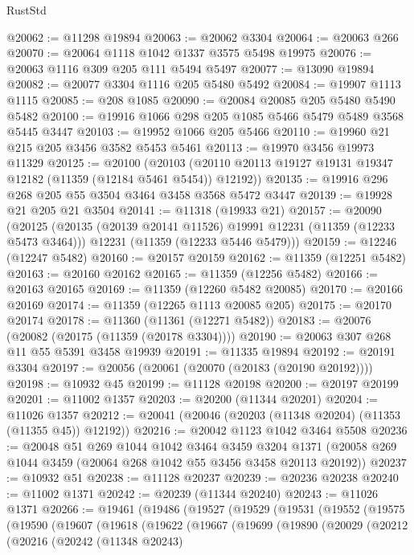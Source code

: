 \begin{lexlean}{RustStd}
\begin{coremodule}
{{{{{{{{{{{{{{{{{{{@20062 := @11298 @19894
@20063 := @20062 @3304
@20064 := @20063 @266
@20070 := @20064 @1118 @1042 @1337 @3575 @5498 @19975
@20076 := @20063 @1116 @309 @205 @111 @5494 @5497
@20077 := @13090 @19894
@20082 := @20077 @3304 @1116 @205 @5480 @5492
@20084 := @19907 @1113 @1115
@20085 := @208 @1085
@20090 := @20084 @20085 @205 @5480 @5490 @5482
@20100 := @19916 @1066 @298 @205 @1085 @5466 @5479 @5489 @3568 @5445 @3447
@20103 := @19952 @1066 @205 @5466
@20110 := @19960 @21 @215 @205 @3456 @3582 @5453 @5461
@20113 := @19970 @3456 @19973 @11329
@20125 := @20100
    (@20103 (@20110 @20113 @19127 @19131 @19347 @12182 (@11359 (@12184 @5461 @5454)) @12192))
@20135 := @19916 @296 @268 @205 @55 @3504 @3464 @3458 @3568 @5472 @3447
@20139 := @19928 @21 @205 @21 @3504
@20141 := @11318 (@19933 @21)
@20157 := @20090
    (@20125
      (@20135 (@20139 @20141 @11526) @19991 @12231 (@11359 (@12233 @5473 @3464)))
      @12231
      (@11359 (@12233 @5446 @5479)))
@20159 := @12246 (@12247 @5482)
@20160 := @20157 @20159
@20162 := @11359 (@12251 @5482)
@20163 := @20160 @20162
@20165 := @11359 (@12256 @5482)
@20166 := @20163 @20165
@20169 := @11359 (@12260 @5482 @20085)
@20170 := @20166 @20169
@20174 := @11359 (@12265 @1113 @20085 @205)
@20175 := @20170 @20174
@20178 := @11360 (@11361 (@12271 @5482))
@20183 := @20076 (@20082 (@20175 (@11359 (@20178 @3304))))
@20190 := @20063 @307 @268 @11 @55 @5391 @3458 @19939
@20191 := @11335 @19894
@20192 := @20191 @3304
@20197 := @20056 (@20061 (@20070 (@20183 (@20190 @20192))))
@20198 := @10932 @45
@20199 := @11128 @20198
@20200 := @20197 @20199
@20201 := @11002 @1357
@20203 := @20200 (@11344 @20201)
@20204 := @11026 @1357
@20212 := @20041 (@20046 (@20203 (@11348 @20204) (@11353 (@11355 @45)) @12192))
@20216 := @20042 @1123 @1042 @3464 @5508
@20236 := @20048
    @51
    @269
    @1044
    @1042
    @3464
    @3459
    @3204
    @1371
    (@20058 @269 @1044 @3459 (@20064 @268 @1042 @55 @3456 @3458 @20113 @20192))
@20237 := @10932 @51
@20238 := @11128 @20237
@20239 := @20236 @20238
@20240 := @11002 @1371
@20242 := @20239 (@11344 @20240)
@20243 := @11026 @1371
@20266 := @19461
    (@19486
      (@19527
        (@19529
          (@19531
            (@19552
              (@19575
                (@19590
                  (@19607
                    (@19618
                      (@19622
                        (@19667
                          (@19699
                            (@19890
                              (@20029
                                (@20212
                                  (@20216
                                    (@20242
                                      (@11348 @20243)
}}}}}}}}}}}}}}}}}}}
\end{coremodule}
\end{lexlean}
